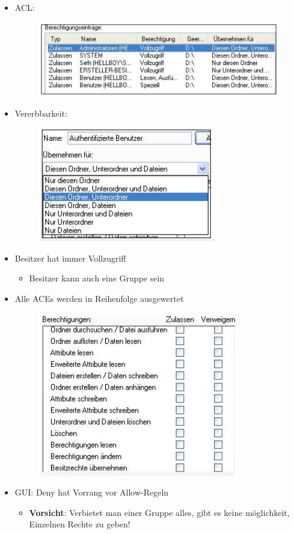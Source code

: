 \documentclass[openany]{book}
\begin{document}
\begin{itemize}
\item ACL:
\begin{figure}[h!]
\centering
\includegraphics[width=0.75\linewidth]{Pics/WACL1.PNG}
\end{figure}
\item Vererbbarkeit:
\begin{figure}[h!]
\centering
\includegraphics[width=0.5\linewidth]{Pics/WACL2.PNG}
\end{figure}
\item Besitzer hat immer Vollzugriff
\begin{itemize}
\item Besitzer kann auch eine Gruppe sein
\end{itemize}
\item Alle ACEs werden in Reihenfolge ausgewertet
\newpage
\begin{figure}[h!]
\centering
\includegraphics[width=0.5\linewidth]{Pics/WACL3.PNG}
\end{figure}
\item GUI: Deny hat Vorrang vor Allow-Regeln
\begin{itemize}
\item \textbf{Vorsicht}: Verbietet man einer Gruppe alles, gibt es keine möglichkeit, Einzelnen Rechte zu geben!
\end{itemize}
\end{itemize}
\end{document}
